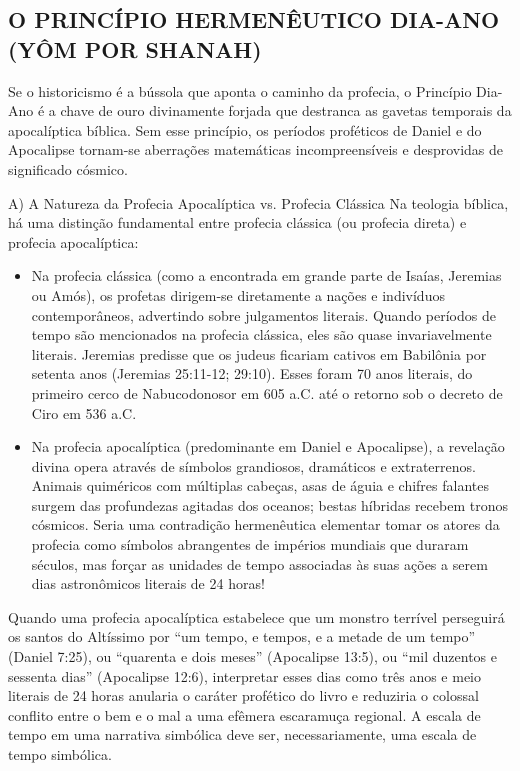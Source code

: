 \documentclass[11pt,a4paper,openany]{book}
\begin{document}
\subsection{O PRINCÍPIO HERMENÊUTICO DIA-ANO (YÔM POR SHANAH)}


Se o historicismo é a bússola que aponta o caminho da profecia, o Princípio Dia-Ano é a chave de ouro divinamente forjada que destranca as gavetas temporais da apocalíptica bíblica. Sem esse princípio, os períodos proféticos de Daniel e do Apocalipse tornam-se aberrações matemáticas incompreensíveis e desprovidas de significado cósmico.

A) A Natureza da Profecia Apocalíptica vs. Profecia Clássica
Na teologia bíblica, há uma distinção fundamental entre profecia clássica (ou profecia direta) e profecia apocalíptica:
\begin{itemize}
  \item Na profecia clássica (como a encontrada em grande parte de Isaías, Jeremias ou Amós), os profetas dirigem-se diretamente a nações e indivíduos contemporâneos, advertindo sobre julgamentos literais. Quando períodos de tempo são mencionados na profecia clássica, eles são quase invariavelmente literais. Jeremias predisse que os judeus ficariam cativos em Babilônia por setenta anos (Jeremias 25:11-12; 29:10). Esses foram 70 anos literais, do primeiro cerco de Nabucodonosor em 605 a.C. até o retorno sob o decreto de Ciro em 536 a.C.
  \item Na profecia apocalíptica (predominante em Daniel e Apocalipse), a revelação divina opera através de símbolos grandiosos, dramáticos e extraterrenos. Animais quiméricos com múltiplas cabeças, asas de águia e chifres falantes surgem das profundezas agitadas dos oceanos; bestas híbridas recebem tronos cósmicos. Seria uma contradição hermenêutica elementar tomar os atores da profecia como símbolos abrangentes de impérios mundiais que duraram séculos, mas forçar as unidades de tempo associadas às suas ações a serem dias astronômicos literais de 24 horas!
\end{itemize}


Quando uma profecia apocalíptica estabelece que um monstro terrível perseguirá os santos do Altíssimo por ``um tempo, e tempos, e a metade de um tempo'' (Daniel 7:25), ou ``quarenta e dois meses'' (Apocalipse 13:5), ou ``mil duzentos e sessenta dias'' (Apocalipse 12:6), interpretar esses dias como três anos e meio literais de 24 horas anularia o caráter profético do livro e reduziria o colossal conflito entre o bem e o mal a uma efêmera escaramuça regional. A escala de tempo em uma narrativa simbólica deve ser, necessariamente, uma escala de tempo simbólica.
\end{document}
